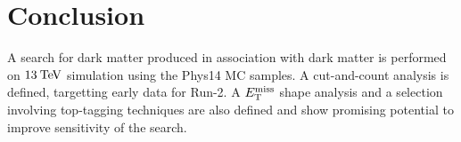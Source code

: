 \section{Conclusion}
\label{sec:conclusion}

A search for dark matter produced in association with dark matter is performed on $13\:\mathrm{Te\kern -0.1em V}$ simulation using the Phys14 MC samples. A cut-and-count analysis is defined, targetting early data for Run-2. A $E_\mathrm{T}^{\mathrm{miss}}$ shape analysis and a selection involving top-tagging techniques are also defined and show promising potential to improve sensitivity of the search.
